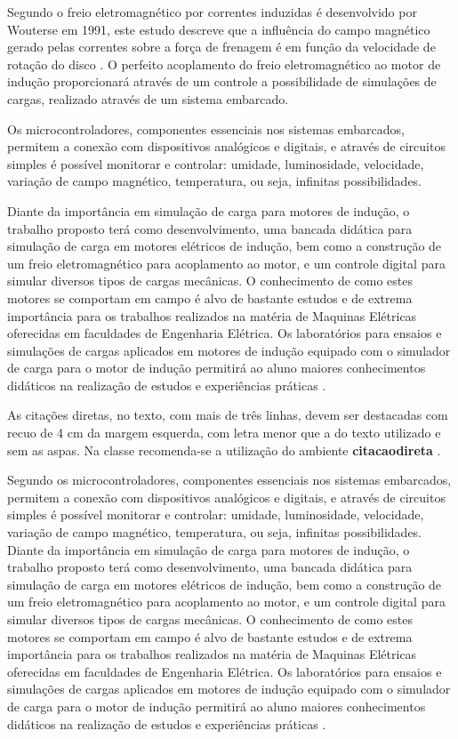 Segundo  o freio eletromagnético  por correntes induzidas é desenvolvido por Wouterse em 1991, este estudo descreve que a influência do campo magnético gerado pelas correntes sobre a força de frenagem é em função da velocidade de rotação do disco \cite{Kasper:2014}.
O perfeito acoplamento do freio eletromagnético ao motor de indução proporcionará através de um controle a possibilidade de simulações de cargas, realizado através de um sistema embarcado.

Os microcontroladores, componentes essenciais nos sistemas embarcados, permitem a conexão com dispositivos analógicos e digitais, e através de circuitos simples é possível monitorar e controlar: umidade, luminosidade, velocidade, variação de campo magnético, temperatura, ou seja, infinitas possibilidades.

Diante da importância em simulação de carga para motores de indução, o trabalho proposto terá como desenvolvimento, uma bancada didática para simulação de carga em motores elétricos de indução, bem como a construção de um freio eletromagnético para acoplamento ao motor, e um controle digital para simular diversos tipos de cargas mecânicas. O conhecimento de como estes motores se comportam em campo é alvo de bastante estudos e de extrema importância para os trabalhos realizados na matéria de Maquinas Elétricas oferecidas em faculdades de Engenharia Elétrica. Os laboratórios para ensaios e simulações de cargas aplicados em motores de indução equipado com o simulador de carga para o motor de indução permitirá ao aluno maiores conhecimentos didáticos na realização de estudos e experiências práticas \cite{Liu:2011}.

\begin{citacaodireta}
	As citações diretas, no texto, com mais de três linhas, devem ser
	destacadas com recuo de 4 cm da margem esquerda, com letra menor que a do texto
	utilizado e sem as aspas. Na classe \textbf{\corujatex} recomenda-se a utilização do ambiente \textbf{citacaodireta} \cite[Pg.3]{Liu:2011}.
\end{citacaodireta}

Segundo  os microcontroladores, componentes essenciais nos sistemas embarcados, permitem a conexão com dispositivos analógicos e digitais, e através de circuitos simples é possível monitorar e controlar: umidade, luminosidade, velocidade, variação de campo magnético, temperatura, ou seja, infinitas possibilidades.
Diante da importância em simulação de carga para motores de indução, o trabalho proposto terá como desenvolvimento, uma bancada didática para simulação de carga em motores elétricos de indução, bem como a construção de um freio eletromagnético para acoplamento ao motor, e um controle digital para simular diversos tipos de cargas mecânicas. O conhecimento de como estes motores se comportam em campo é alvo de bastante estudos e de extrema importância para os trabalhos realizados na matéria de Maquinas Elétricas oferecidas em faculdades de Engenharia Elétrica. Os laboratórios para ensaios e simulações de cargas aplicados em motores de indução equipado com o simulador de carga para o motor de indução permitirá ao aluno maiores conhecimentos didáticos na realização de estudos e experiências práticas \cite{Liu:2011}.

